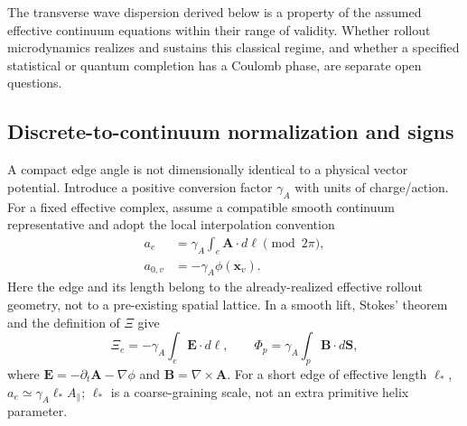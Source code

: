 \documentclass[11pt]{article}
\begin{document}
The transverse wave dispersion derived below is a property of the assumed effective continuum equations within their range of validity. Whether rollout microdynamics realizes and sustains this classical regime, and whether a specified statistical or quantum completion has a Coulomb phase, are separate open questions.

\subsection{Discrete-to-continuum normalization and signs}
\label{sec:normalizationmap}

A compact edge angle is not dimensionally identical to a physical vector potential. Introduce a positive conversion factor $\gamma_A$ with units of charge/action. For a fixed effective complex, assume a compatible smooth continuum representative and adopt the local interpolation convention
\begin{equation}
\boxed{
\begin{aligned}
a_e&=\gamma_A\int_e\mathbf A\cdot d\boldsymbol\ell
\pmod{2\pi},\\
a_{0,v}&=-\gamma_A\phi(\mathbf x_v).
\end{aligned}
}
\end{equation}
Here the edge and its length belong to the already-realized effective rollout geometry, not to a pre-existing spatial lattice. In a smooth lift, Stokes' theorem and the definition of $\Xi$ give
\begin{equation}
\Xi_e=-\gamma_A\int_e\mathbf E\cdot d\boldsymbol\ell,
\qquad
\Phi_p=\gamma_A\int_p\mathbf B\cdot d\mathbf S,
\end{equation}
where $\mathbf E=-\partial_t\mathbf A-\nabla\phi$ and $\mathbf B=\nabla\times\mathbf A$. For a short edge of effective length $\ell_*$, $a_e\simeq\gamma_A\ell_* A_\parallel$; $\ell_*$ is a coarse-graining scale, not an extra primitive helix parameter.
\end{document}
